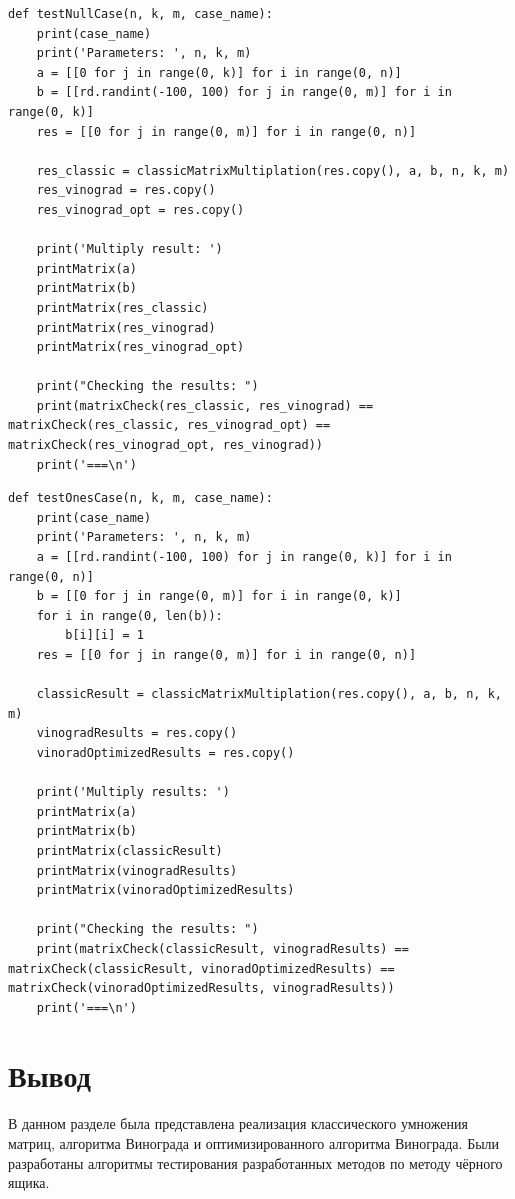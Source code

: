 \begin{lstlisting}[label=some-code-7,caption=Реализация функции для случая нулевой матрицы]
def testNullCase(n, k, m, case_name):
    print(case_name)
    print('Parameters: ', n, k, m)
    a = [[0 for j in range(0, k)] for i in range(0, n)]
    b = [[rd.randint(-100, 100) for j in range(0, m)] for i in range(0, k)]
    res = [[0 for j in range(0, m)] for i in range(0, n)]

    res_classic = classicMatrixMultiplation(res.copy(), a, b, n, k, m)
    res_vinograd = res.copy()
    res_vinograd_opt = res.copy()

    print('Multiply result: ')
    printMatrix(a)
    printMatrix(b)
    printMatrix(res_classic)
    printMatrix(res_vinograd)
    printMatrix(res_vinograd_opt)

    print("Checking the results: ")
    print(matrixCheck(res_classic, res_vinograd) == matrixCheck(res_classic, res_vinograd_opt) == matrixCheck(res_vinograd_opt, res_vinograd))
    print('===\n')
\end{lstlisting}

\begin{lstlisting}[label=some-code-8,caption=Реализация для случая единичной матрицы]
def testOnesCase(n, k, m, case_name):
    print(case_name)
    print('Parameters: ', n, k, m)
    a = [[rd.randint(-100, 100) for j in range(0, k)] for i in range(0, n)]
    b = [[0 for j in range(0, m)] for i in range(0, k)]
    for i in range(0, len(b)):
        b[i][i] = 1
    res = [[0 for j in range(0, m)] for i in range(0, n)]

    classicResult = classicMatrixMultiplation(res.copy(), a, b, n, k, m)
    vinogradResults = res.copy()
    vinoradOptimizedResults = res.copy()

    print('Multiply results: ')
    printMatrix(a)
    printMatrix(b)
    printMatrix(classicResult)
    printMatrix(vinogradResults)
    printMatrix(vinoradOptimizedResults)

    print("Checking the results: ")
    print(matrixCheck(classicResult, vinogradResults) == matrixCheck(classicResult, vinoradOptimizedResults) == matrixCheck(vinoradOptimizedResults, vinogradResults))
    print('===\n')     

\end{lstlisting}


\section{Вывод}
В данном разделе была представлена реализация классического умножения матриц, алгоритма Винограда и оптимизированного алгоритма Винограда. Были разработаны алгоритмы тестирования разработанных методов по методу чёрного ящика.

